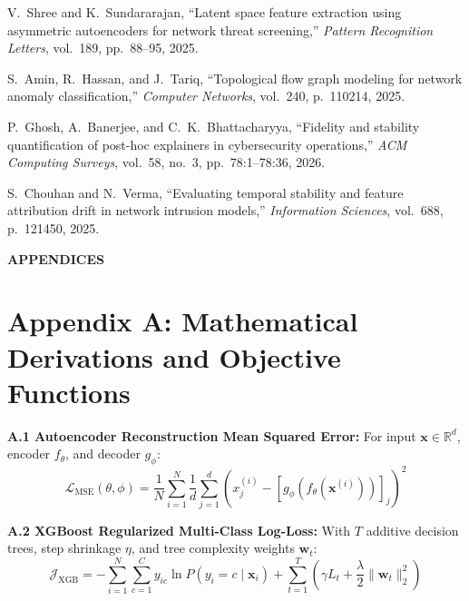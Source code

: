 \documentclass[12pt,a4paper]{report}
\begin{document}
\begin{enumerate}[label={[\arabic*]}, leftmargin=*, itemsep=4pt]
\item V.~Shree and K.~Sundararajan, ``Latent space feature extraction using asymmetric autoencoders for network threat screening,'' \emph{Pattern Recognition Letters}, vol.~189, pp.~88--95, 2025.
\item S.~Amin, R.~Hassan, and J.~Tariq, ``Topological flow graph modeling for network anomaly classification,'' \emph{Computer Networks}, vol.~240, p.~110214, 2025.
\item P.~Ghosh, A.~Banerjee, and C.~K.~Bhattacharyya, ``Fidelity and stability quantification of post-hoc explainers in cybersecurity operations,'' \emph{ACM Computing Surveys}, vol.~58, no.~3, pp.~78:1--78:36, 2026.
\item S.~Chouhan and N.~Verma, ``Evaluating temporal stability and feature attribution drift in network intrusion models,'' \emph{Information Sciences}, vol.~688, p.~121450, 2025.
\end{enumerate}

\clearpage
\begin{center}
{\Large\bfseries APPENDICES}\label{sec:appendices}\\[0.6cm]
\end{center}

\section*{Appendix A: Mathematical Derivations and Objective Functions}
\textbf{A.1 Autoencoder Reconstruction Mean Squared Error:}
For input $\mathbf{x} \in \mathbb{R}^d$, encoder $f_\theta$, and decoder $g_\phi$:
\begin{equation}
\mathcal{L}_{\text{MSE}}(\theta, \phi) = \frac{1}{N}\sum_{i=1}^N \frac{1}{d}\sum_{j=1}^d \left(x_j^{(i)} - [g_\phi(f_\theta(\mathbf{x}^{(i)}))]_j\right)^2
\label{eq:app_mse}
\end{equation}

\textbf{A.2 XGBoost Regularized Multi-Class Log-Loss:}
With $T$ additive decision trees, step shrinkage $\eta$, and tree complexity weights $\mathbf{w}_t$:
\begin{equation}
\mathcal{J}_{\text{XGB}} = -\sum_{i=1}^N \sum_{c=1}^C y_{ic} \ln P(y_i = c \mid \mathbf{x}_i) + \sum_{t=1}^T \left(\gamma L_t + \frac{\lambda}{2}\|\mathbf{w}_t\|_2^2\right)
\label{eq:app_xgb}
\end{equation}
\end{document}
